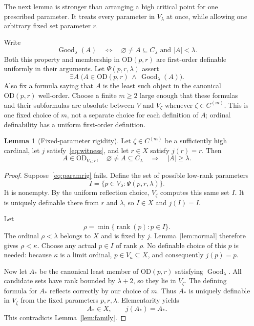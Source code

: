 \documentclass[11pt,letterpaper]{article}
\theoremstyle{definition}
\newtheorem{lemma}[definition]{Lemma}
\numberwithin{equation}{section}
\newcommand{\OD}{\mathrm{OD}}
\newcommand{\rank}{\operatorname{rank}}
\newcommand{\C}{C_\lambda}
\newcommand{\Good}{\operatorname{Good}}
\begin{document}
The next lemma is stronger than arranging a high critical point for one prescribed parameter. It treats every parameter in $V_\lambda$ at once, while allowing one arbitrary fixed set parameter $r$.

Write
\begin{equation}
\Good_\lambda(A)\quad\Longleftrightarrow\quad
\varnothing\ne A\subseteq\C\text{ and }|A|<\lambda.
\label{eq:good}
\end{equation}
Both this property and membership in $\OD(p,r)$ are first-order definable uniformly in their arguments. Let $\Psi(p,r,\lambda)$ assert
\[
\exists A\;\bigl(A\in\OD(p,r)\ \wedge\ \Good_\lambda(A)\bigr).
\]
Also fix a formula saying that $A$ is the least such object in the canonical $\OD(p,r)$ well-order. Choose a finite $m\ge2$ large enough that these formulas and their subformulas are absolute between $V$ and $V_\zeta$ whenever $\zeta\in C^{(m)}$. This is one fixed choice of $m$, not a separate choice for each definition of $A$; ordinal definability has a uniform first-order definition.

\begin{lemma}[Fixed-parameter rigidity]\label{lem:parameter}
Let $\zeta\in C^{(m)}$ be a sufficiently high cardinal, let $j$ satisfy~\eqref{eq:witness}, and let $r\in X$ satisfy $j(r)=r$. Then
\begin{equation}
A\in\OD_{V_\lambda;r},\quad\varnothing\ne A\subseteq\C
\quad\Longrightarrow\quad |A|\ge\lambda.
\label{eq:paramrig}
\end{equation}
\end{lemma}
\begin{proof}
Suppose~\eqref{eq:paramrig} fails. Define the set of possible low-rank parameters
\[
I=\{p\in V_\lambda:\Psi(p,r,\lambda)\}.
\]
It is nonempty. By the uniform reflection choice, $V_\zeta$ computes this same set $I$. It is uniquely definable there from $r$ and $\lambda$, so $I\in X$ and $j(I)=I$.

Let
\[
\rho=\min\{\rank(p):p\in I\}.
\]
The ordinal $\rho<\lambda$ belongs to $X$ and is fixed by $j$. Lemma~\ref{lem:normal} therefore gives $\rho<\kappa$. Choose any actual $p\in I$ of rank $\rho$. No definable choice of this $p$ is needed: because $\kappa$ is a limit ordinal, $p\in V_\kappa\subseteq X$, and consequently $j(p)=p$.

Now let $A_*$ be the canonical least member of $\OD(p,r)$ satisfying $\Good_\lambda$. All candidate sets have rank bounded by $\lambda+2$, so they lie in $V_\zeta$. The defining formula for $A_*$ reflects correctly by our choice of $m$. Thus $A_*$ is uniquely definable in $V_\zeta$ from the fixed parameters $p,r,\lambda$. Elementarity yields
\[
A_*\in X,\qquad j(A_*)=A_*.
\]
This contradicts Lemma~\ref{lem:family}.
\end{proof}
\end{document}
